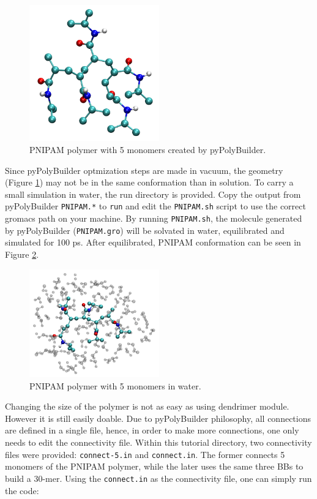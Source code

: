 \begin{figure}
    \center
    \includegraphics[width=0.5\textwidth]{PNIPAM/PNIPAMPPB.pdf}
    \caption{PNIPAM polymer with 5 monomers created by pyPolyBuilder.}
    \label{fig:PNIPAMPPB}
\end{figure}

Since pyPolyBuilder optmization steps are made in vacuum, the geometry (Figure \ref{fig:PNIPAMPPB}) may not be in the same conformation than in solution.
To carry a small simulation in water, the run directory is provided.
Copy the output from pyPolyBuilder \texttt{PNIPAM.*} to \texttt{run} and edit the \texttt{PNIPAM.sh} script to use the correct gromacs path on your machine.
By running \texttt{PNIPAM.sh}, the molecule generated by pyPolyBuilder (\texttt{PNIPAM.gro}) will be solvated in water, equilibrated and simulated for 100 ps.
After equilibrated, PNIPAM conformation can be seen in Figure \ref{fig:PNIPAMSOL}.

\begin{figure}
    \center
    \includegraphics[width=0.5\textwidth]{PNIPAM/PNIPAMSOL.pdf}
    \caption{PNIPAM polymer with 5 monomers in water.}
    \label{fig:PNIPAMSOL}
\end{figure}

Changing the size of the polymer is not as easy as using dendrimer module.
However it is still easily doable.
Due to pyPolyBuilder philosophy, all connections are defined in a single file, hence, in order to make more connections, one only needs to edit the connectivity file.
Within this tutorial directory, two connectivity files were provided: \texttt{connect-5.in} and \texttt{connect.in}.
The former connects 5 monomers of the PNIPAM polymer, while the later uses the same three BBs to build a 30-mer.
Using the \texttt{connect.in} as the connectivity file, one can simply run the code:

